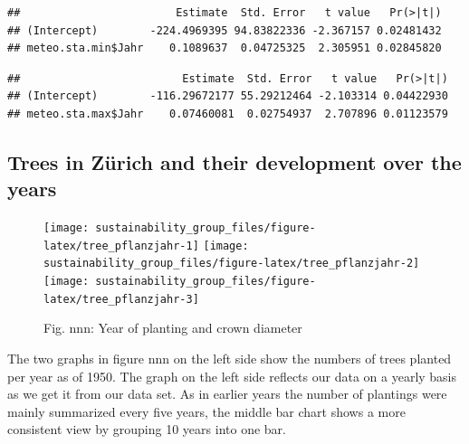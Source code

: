 \documentclass[
]{article}
\newenvironment{Shaded}{\begin{snugshade}}{\end{snugshade}}
\newcommand{\FunctionTok}[1]{\textcolor[rgb]{0.00,0.00,0.00}{#1}}
\newcommand{\NormalTok}[1]{#1}
\newcommand{\SpecialCharTok}[1]{\textcolor[rgb]{0.00,0.00,0.00}{#1}}
\begin{document}
\begin{verbatim}
##                        Estimate  Std. Error   t value   Pr(>|t|)
## (Intercept)        -224.4969395 94.83822336 -2.367157 0.02481432
## meteo.sta.min$Jahr    0.1089637  0.04725325  2.305951 0.02845820
\end{verbatim}

\begin{Shaded}
\end{Shaded}

\begin{verbatim}
##                         Estimate  Std. Error   t value   Pr(>|t|)
## (Intercept)        -116.29672177 55.29212464 -2.103314 0.04422930
## meteo.sta.max$Jahr    0.07460081  0.02754937  2.707896 0.01123579
\end{verbatim}

\hfill\break

\hypertarget{trees-in-zuxfcrich-and-their-development-over-the-years}{%
\subsection{Trees in Zürich and their development over the
years}\label{trees-in-zuxfcrich-and-their-development-over-the-years}}

\hfill\break

\begin{figure}
\texttt{[image: sustainability\_group\_files/figure-latex/tree\_pflanzjahr-1]} \texttt{[image: sustainability\_group\_files/figure-latex/tree\_pflanzjahr-2]} \texttt{[image: sustainability\_group\_files/figure-latex/tree\_pflanzjahr-3]} \caption{Fig. nnn: Year of planting and crown diameter}\label{fig:tree_pflanzjahr}
\end{figure}

The two graphs in figure nnn on the left side show the numbers of trees
planted per year as of 1950. The graph on the left side reflects our
data on a yearly basis as we get it from our data set. As in earlier
years the number of plantings were mainly summarized every five years,
the middle bar chart shows a more consistent view by grouping 10 years
into one bar.
\end{document}
